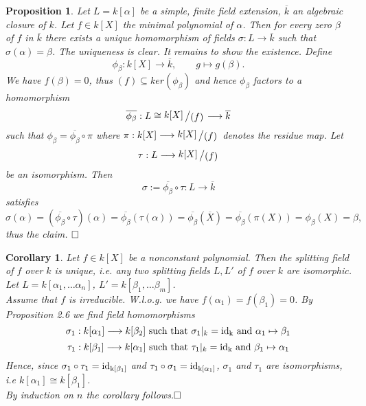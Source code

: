 \documentclass[11pt]{book}
\newtheorem{proposition}[theorem]{Proposition}
\newtheorem{corollary}[theorem]{Corollary}
\theoremstyle{nonumberbreak}
\newenvironment{pr}[1][]{\ifthenelse{\equal{#1}{}}{\proof}{\proof[#1]}\rm}{\endproof}
\newcommand{\slant}[2]{{\raisebox{.1em}{$#1$}\left/\raisebox{-.1em}{$#2$}\right.}}
\begin{document}
\begin{spacing}{1.3}
\begin{proposition} %
Let $L=k[\alpha]$ be a simple, finite field extension, $\overline{k}$ an algebraic closure of $k$. Let $f \in k[X]$ the minimal polynomial of $\alpha$. Then for every zero $\beta$ of $f$ in $\overline{k}$ there exists a unique homomorphism of fields $\sigma: L \longrightarrow \overline{k}$ such that $\sigma(\alpha)=\beta$.
\begin{pr}
The uniqueness is clear. It remains to show the existence.
Define $$\phi_{\beta}:k[X] \longrightarrow \overline{k}, \qquad g \mapsto g(\beta).$$ We have $f(\beta)=0$, thus $( f ) \subseteq ker(\phi_{\beta})$ and hence $\phi_{\beta}$ factors to a homomorphism $$\overline{\phi_{\beta}}: L \cong \slant{k[X]}{( f )} \longrightarrow \overline{k}$$such that $\phi_{\beta}=\overline{\phi_{\beta}}\circ \pi$ where $\pi: k[X] \longrightarrow \slant{k[X]}{( f )}$ denotes the residue map. Let $$\tau: L \longrightarrow \slant{k[X]}{( f )}$$ be an isomorphism. Then
$$\sigma:= \overline{\phi_{\beta}} \circ \tau: L \longrightarrow \overline{k}$$ satisfies $$\sigma(\alpha)=\left(\overline{\phi_{\beta}} \circ \tau\right)(\alpha)=\overline{\phi_{\beta}}\left(\tau(\alpha)\right)=\overline{\phi_{\beta}}(\overline{X})=\overline{\phi_{\beta}}\left(\pi(X)\right)=\phi_{\beta}(X)=\beta,$$
thus the claim. $\hfill \Box$
\end{pr}
\end{proposition}

\begin{corollary} %
Let $f \in k[X]$ be a nonconstant polynomial. Then the splitting field of $f$ over $k$ is unique, i.e. any two splitting fields $L, L'$ of $f$ over $k$ are isomorphic.
\begin{pr}
Let $L=k[\alpha_1, \dots \alpha_n]$, $L'=k[\beta_1, \dots \beta_m]$.\\
Assume that $f$ is irreducible. W.l.o.g. we have $f(\alpha_1)=f(\beta_1)=0$. By Proposition 2.6 we find field homomorphisms\\
$$\sigma_1: k[\alpha_1] \longrightarrow k[\beta_2] \textrm{ such that }\sigma_1 |_{k}=\rm{id}_{k}\textrm{ and }\alpha_1 \mapsto \beta_1$$
$$\tau_1: k[\beta_1] \longrightarrow k[\alpha_1] \textrm{ such that }\tau_1 |_{k}=\rm{id}_{k}\textrm{ and }\beta_1 \mapsto \alpha_1$$
Hence, since $\sigma_1 \circ \tau_1 = \rm{id}_{k[\beta_1]}$ and $\tau_1 \circ \sigma_1 = \rm{id}_{k[\alpha_1]}$, $\sigma_1$ and $\tau_1$ are isomorphisms, i.e $k[\alpha_1] \cong k[\beta_1]$.\\
By induction on $n$ the corollary follows.$\hfill \Box$
\end{pr}
\end{corollary}


\end{spacing}
\end{document}
